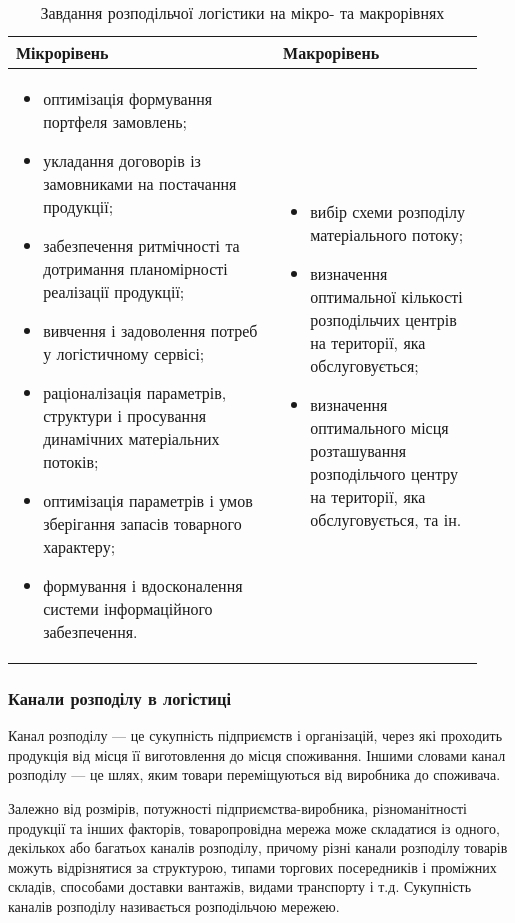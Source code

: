 \begin{table}[H]
	\caption{Завдання розподільчої логістики на мікро- та макрорівнях}
	\label{tab:logistic_functions}
	\begin{tabular}{@{}|p{0.53\linewidth}|p{0.4\linewidth}|@{}}
	 	\hline
		Мікрорівень & Макрорівень \\ \hline
		\begin{itemize}[leftmargin=*]
			\item оптимізація формування портфеля замовлень;
			\item укладання договорів із замовниками на постачання продукції;
			\item забезпечення ритмічності та дотримання планомірності реалізації продукції;
			\item вивчення і задоволення потреб у логістичному сервісі;
			\item раціоналізація параметрів, структури і просування динамічних матеріальних потоків;
			\item оптимізація параметрів і умов зберігання запасів товарного характеру;
			\item формування і вдосконалення системи інформаційного забезпечення.
		\end{itemize}
		&
		\begin{itemize}[leftmargin=*]
			\item вибір схеми розподілу матеріального потоку;
			\item визначення оптимальної кількості розподільчих центрів на території, яка обслуговується;
			\item визначення оптимального місця розташування розподільчого центру на території, яка обслуговується, та ін.
		\end{itemize} \\ \hline
	\end{tabular}
\end{table}

\subsubsection{Канали розподілу в логістиці}
Канал розподілу --- це сукупність підприємств і організацій, через які проходить продукція від місця її виготовлення до місця споживання. 
Іншими словами канал розподілу --- це шлях, яким товари переміщуються від виробника до споживача.

Залежно від розмірів, потужності підприємства-виробника, різноманітності продукції та інших факторів, товаропровідна мережа може складатися із одного, декількох або багатьох каналів розподілу, причому різні канали розподілу товарів можуть відрізнятися за структурою, типами торгових посередників і проміжних складів, способами доставки вантажів, видами транспорту і т.д. 
Сукупність каналів розподілу називається розподільчою мережею.

